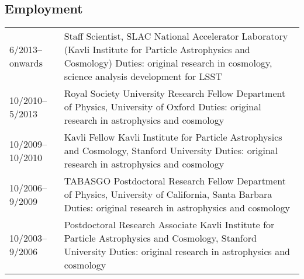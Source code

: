 \subsection*{Employment}

\begin{tabular}{@{}p{3.5cm}p{14.8cm}}
6/2013--onwards   & Staff Scientist, SLAC National Accelerator Laboratory \newline
                    (Kavli Institute for Particle Astrophysics and Cosmology) \newline
                    Duties: original research in cosmology, science analysis development for LSST\\
10/2010--5/2013   & Royal Society University Research Fellow \newline
                    Department of Physics, University of Oxford \newline
                    Duties: original research in astrophysics and cosmology \\
10/2009--10/2010  & Kavli Fellow\newline
                    Kavli Institute for Particle Astrophysics and Cosmology, Stanford University \newline
                    Duties: original research in astrophysics and cosmology \\
10/2006--9/2009   & TABASGO Postdoctoral Research Fellow\newline
                    Department of Physics, University of California, Santa Barbara \newline
                    Duties: original research in astrophysics and cosmology \\
10/2003--9/2006   & Postdoctoral Research Associate\newline
                    Kavli Institute for Particle Astrophysics and Cosmology, Stanford University \newline
                    Duties: original research in astrophysics and cosmology \\
\end{tabular}
